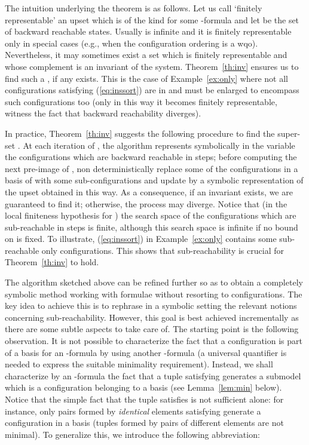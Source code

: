 \documentclass{LMCS}
\theoremstyle{plain}\newtheorem{assumption}[thm]{Assumption}
\theoremstyle{plain}\newtheorem{proposition}[thm]{Proposition}
\theoremstyle{plain}\newtheorem{property}[thm]{Property}
\theoremstyle{plain}\newtheorem{example}[thm]{Example}
\theoremstyle{plain}\newtheorem{claim}[thm]{Claim}
\theoremstyle{plain}\newtheorem{lemma}[thm]{Lemma}
\begin{document}
The intuition underlying the theorem is as follows. Let us call
`finitely representable' an upset which is of the kind 
for some -formula  and let  be the set of backward
reachable states.  Usually  is infinite and it is finitely
representable only in special cases (e.g., when the configuration
ordering is a wqo).  Nevertheless, it may sometimes exist a set
 which is finitely representable and whose complement
is an invariant of the system.  Theorem~\ref{th:inv} ensures us to
find such a , if any exists.  This is the case of
Example~\ref{ex:only} where not all configurations satisfying
(\ref{eq:inssort}) are in  and  must be enlarged to
encompass such configurations too (only in this way it becomes
finitely representable, witness the fact that backward reachability
diverges).

In practice, Theorem~\ref{th:inv} suggests the following procedure to
find the super-set .  At each iteration of , the
algorithm represents symbolically in the variable  the
configurations which are backward reachable in  steps; before
computing the next pre-image of , non deterministically replace
some of the configurations in a basis of  with some
sub-configurations and update  by a symbolic representation of the
upset obtained in this way.  As a consequence, if an invariant exists,
we are guaranteed to find it; otherwise, the process may diverge.
Notice that (in the local finiteness hypothesis for ) the search
space of the configurations which are sub-reachable in  steps is
finite, although this search space is infinite if no bound on  is
fixed.  To illustrate,
(\ref{eq:inssort}) in
Example~\ref{ex:only} contains some sub-reachable only configurations.
This shows that sub-reachability is crucial for Theorem~\ref{th:inv}
to hold.

The algorithm sketched above can be refined further so as to obtain a
completely symbolic method working with formulae without resorting to
configurations.
The key idea to achieve this is to rephrase in a symbolic setting the
relevant notions concerning sub-reachability.  However, this goal is
best achieved incrementally as there are some subtle aspects to take
care of.  The starting point is the following observation.  It is not
possible to characterize the fact that a configuration  is
part of a basis for an -formula  by using another -formula (a universal quantifier
is needed to express the suitable minimality requirement).  Instead,
we shall characterize by an -formula the fact that a tuple
satisfying  generates a submodel which is a
configuration belonging to a basis (see Lemma~\ref{lem:min} below).
Notice that the simple fact that the tuple satisfies  is not
sufficient alone: for instance, only pairs formed by \emph{identical}
elements satisfying  generate a configuration in a
basis (tuples formed by pairs of different elements are not minimal).
To generalize this, we introduce the following abbreviation:
\end{document}

